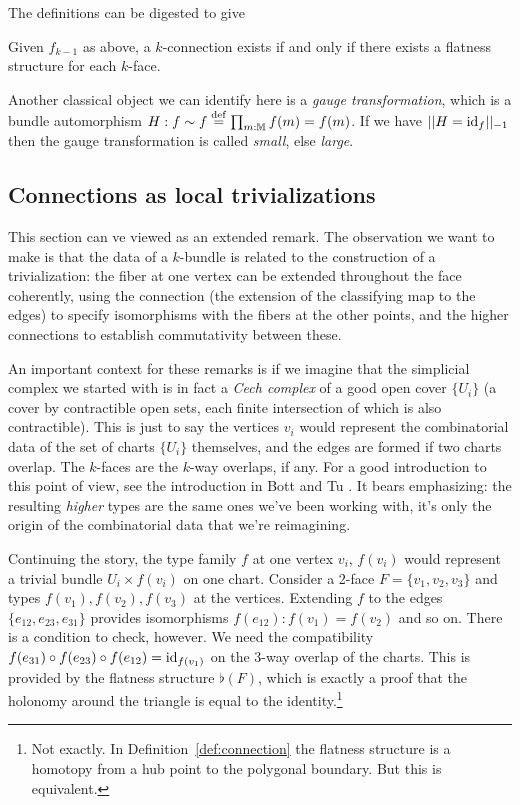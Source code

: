 The definitions can be digested to give
\begin{mylemma}
Given \( f_{k-1} \) as above, a \( k \)-connection exists if and only if there exists a flatness structure for each \( k \)-face.
\end{mylemma}

\begin{mynote}
Another classical object we can identify here is a \emph{gauge transformation}, which is a bundle automorphism \( H:f\sim f\stackrel{\mathrm{def}}{=} \prod_{m:\mathbb{M}}f(m)=f(m) \). If we have \( ||H=\text{id}_f||_{-1} \) then the gauge transformation is called \emph{small}, else \emph{large}.
\end{mynote}

\subsection{Connections as local trivializations}
This section can ve viewed as an extended remark. The observation we want to make is that the data of a \( k \)-bundle is related to the construction of a trivialization: the fiber at one vertex can be extended throughout the face coherently, using the connection (the extension of the classifying map to the edges) to specify isomorphisms with the fibers at the other points, and the higher connections to establish commutativity between these.

An important context for these remarks is if we imagine that the simplicial complex we started with is in fact a \emph{Cech complex} of a good open cover \( \{U_i\} \) (a cover by contractible open sets, each finite intersection of which is also contractible). This is just to say the vertices \( v_i \) would represent the combinatorial data of the set of charts \( \{U_i\} \) themselves, and the edges are formed if two charts overlap. The \( k \)-faces are the \( k \)-way overlaps, if any. For a good introduction to this point of view, see the introduction in Bott and Tu \cite{bott_tu}. It bears emphasizing: the resulting \emph{higher} types are the same ones we've been working with, it's only the origin of the combinatorial data that we're reimagining.

Continuing the story, the type family \( f \) at one vertex \( v_i \), \( f(v_i) \) would represent a trivial bundle \( U_i\times f(v_i) \) on one chart. Consider a 2-face \( F=\{v_1, v_2, v_3\} \) and types \( f(v_1), f(v_2), f(v_3) \) at the vertices. Extending \( f \) to the edges \( \{e_{12}, e_{23}, e_{31}\} \) provides isomorphisms \( f(e_{12}):f(v_1)=f(v_2) \) and so on. There is a condition to check, however. We need the compatibility \( f(e_{31})\circ f(e_{23})\circ f(e_{12})=\text{id}_{f(v_1)} \) on the 3-way overlap of the charts. This is provided by the flatness structure \( \flat(F) \), which is exactly a proof that the holonomy around the triangle is equal to the identity.\footnote{Not exactly. In Definition~\ref{def:connection} the flatness structure is a homotopy from a hub point to the polygonal boundary. But this is equivalent.}

